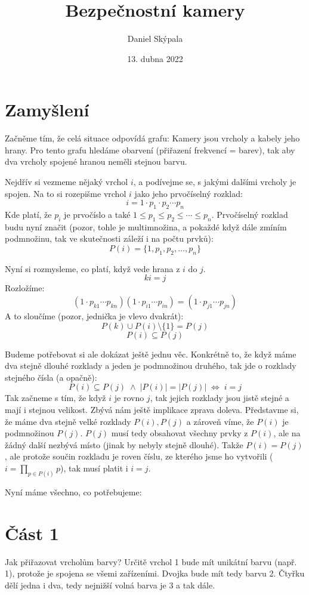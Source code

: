 \documentclass{article}
\title{Bezpečnostní kamery}
\author{Daniel Skýpala}
\date{13. dubna 2022}
\begin{document}
\maketitle

\section*{Zamyšlení}
Začněme tím, že celá situace odpovídá grafu: Kamery jsou vrcholy a kabely jeho hrany. Pro tento grafu hledáme obarvení (přiřazení frekvencí = barev),
tak aby dva vrcholy spojené hranou neměli stejnou barvu.

Nejdřív si vezmeme nějaký vrchol \(i\), a podívejme se, s jakými dalšími vrcholy je spojen. Na to si rozepišme vrchol \(i\) jako jeho
prvočíselný rozklad:
\[i = 1 \cdot p_1 \cdot p_2 \cdots p_n\]
Kde platí, že \(p_i\) je prvočíslo a také \(1 \leq p_1 \leq p_2 \leq \cdots \leq p_n\). Prvočíselný rozklad budu nyní značit (pozor,
tohle je multimnožina, a pokaždé když dále zmíním podmnožinu, tak ve skutečnosti záleží i na počtu prvků):
\[P(i) = \{1, p_1, p_2, \dots, p_n\}\]

Nyní si rozmysleme, co platí, když vede hrana z \(i\) do \(j\).
\[ki = j\]
Rozložíme:
\[(1 \cdot p_{k1} \cdots p_{kn}) (1 \cdot p_{i1} \cdots p_{in}) = (1 \cdot p_{j1} \cdots p_{jn})\]
A to sloučíme (pozor, jednička je vlevo dvakrát):
\[P(k) \cup P(i) \setminus \{1\} = P(j)\]
\[P(i) \subseteq P(j)\]

Budeme potřebovat si ale dokázat ještě jednu věc. Konkrétně to, že když máme dva stejně dlouhé rozklady a jeden je podmnožinou druhého,
tak jde o rozklady stejného čísla (a opačně):
\[P(i) \subseteq P(j) \;\land\; |P(i)| = |P(j)| \; \Leftrightarrow \; i = j\]
Tak začneme s tím, že když \(i\) je rovno \(j\), tak jejich rozklady jsou jistě stejné a mají i stejnou velikost. 
Zbývá nám ještě implikace zprava doleva. Představme si, že máme dva stejně velké rozklady \(P(i), P(j)\) a zároveň víme, že \(P(i)\) je
podmnožinou \(P(j)\). \(P(j)\) musí tedy obsahovat všechny prvky z \(P(i)\), ale na žádný další nezbývá místo (jinak by nebyly stejně dlouhé).
Takže \(P(i) = P(j)\), ale protože součin rozkladu je roven číslu, ze kterého jsme ho vytvořili (\(i = \prod_{p \in P(i)} p\)), tak musí platit
i \(i = j\).

Nyní máme všechno, co potřebujeme:

\section*{Část 1}
Jak přiřazovat vrcholům barvy? Určitě vrchol 1 bude mít unikátní barvu (např. 1), protože je spojena se všemi zařízeními. Dvojka
bude mít tedy barvu 2. Čtyřku dělí jedna i dva, tedy nejnižší volná barva je 3 a tak dále.
\end{document}
